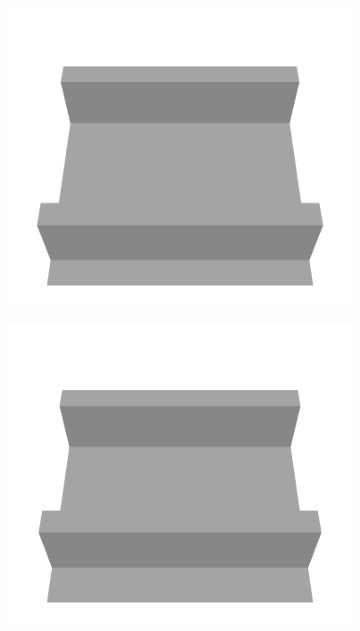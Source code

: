 \documentclass[../document.tex]{subfiles}
\begin{document}
\begin{figure} [htbp]
    \begin{subfigure}[b]{0.24\textwidth}
    \includegraphics[width=\linewidth]{../img/5/custom_patches/tunnel/all/08-3d.png}
    \end{subfigure}
    \begin{subfigure}[b]{0.24\textwidth}
    \includegraphics[width=\linewidth]{../img/5/custom_patches/tunnel/all/11-3d.png}
    \end{subfigure}
    \begin{subfigure}[b]{0.24\textwidth}

\end{subfigure}
\end{figure}
\end{document}
